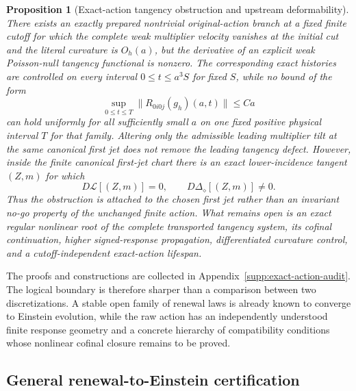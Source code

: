 \documentclass[11pt]{article}
\newtheorem{proposition}[proposition]{Proposition}
\theoremstyle{definition}
\theoremstyle{remark}
\begin{document}
\begin{proposition}[Exact-action tangency obstruction and upstream deformability]
\label{prop:main-exact-action-tangency}
There exists an exactly prepared nontrivial original-action branch at a fixed
finite cutoff for which the complete weak multiplier velocity vanishes at the
initial cut and the literal curvature is $O_h(a)$, but the derivative of an
explicit weak Poisson-null tangency functional is nonzero.  The corresponding
exact histories are controlled on every interval $0\le t\le a^3S$ for fixed
$S$, while no bound of the form
\begin{equation}
 \sup_{0\le t\le T}\|R_{0i0j}(g_h)(a,t)\|\le Ca
 \label{eq:main-exact-action-no-fixed-linear}
\end{equation}
can hold uniformly for all sufficiently small $a$ on one fixed positive
physical interval $T$ for that family.  Altering only the admissible leading
multiplier tilt at the same canonical first jet does not remove the leading
tangency defect.  However, inside the finite canonical first-jet chart there
is an exact lower-incidence tangent $(Z,m)$ for which
\begin{equation}
 \boxed{D\mathcal L[(Z,m)]=0,
 \qquad D\Delta_\diamond[(Z,m)]\ne0.}
 \label{eq:main-exact-action-upstream-tangent}
\end{equation}
Thus the obstruction is attached to the chosen first jet rather than an
invariant no-go property of the unchanged finite action.  What remains open is
an exact regular nonlinear root of the complete transported tangency system,
its cofinal continuation, higher signed-response propagation, differentiated
curvature control, and a cutoff-independent exact-action lifespan.
\end{proposition}

The proofs and constructions are collected in
Appendix~\ref{supp:exact-action-audit}.  The logical boundary is therefore
sharper than a comparison between two discretizations.  A stable open family
of renewal laws is already known to converge to Einstein evolution, while the
raw action has an independently understood finite response geometry and a
concrete hierarchy of compatibility conditions whose nonlinear cofinal
closure remains to be proved.

\subsection{General renewal-to-Einstein certification}
\end{document}
